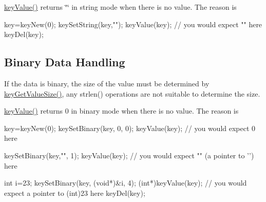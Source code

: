 \hyperlink{group__keyvalue_ga6f29609c5da53c6dc26a98678d5752af}{keyValue()} returns \char`\"{}\char`\"{} in string mode when there is no value. The reason is 
\begin{DoxyCode}
key=keyNew(0);
keySetString(key,"");
keyValue(key); // you would expect "" here
keyDel(key);
\end{DoxyCode}
\hypertarget{group__keyvalue_binary}{}\subsection{Binary Data Handling}\label{group__keyvalue_binary}
If the data is binary, the size of the value must be determined by \hyperlink{group__keyvalue_gae326672fffb7474abfe9baf53b73217e}{keyGetValueSize()}, any strlen() operations are not suitable to determine the size.

\hyperlink{group__keyvalue_ga6f29609c5da53c6dc26a98678d5752af}{keyValue()} returns 0 in binary mode when there is no value. The reason is 
\begin{DoxyCode}
key=keyNew(0);
keySetBinary(key, 0, 0);
keyValue(key); // you would expect 0 here

keySetBinary(key,"", 1);
keyValue(key); // you would expect "" (a pointer to '\0') here

int i=23;
keySetBinary(key, (void*)&i, 4);
(int*)keyValue(key); // you would expect a pointer to (int)23 here
keyDel(key);
\end{DoxyCode}


